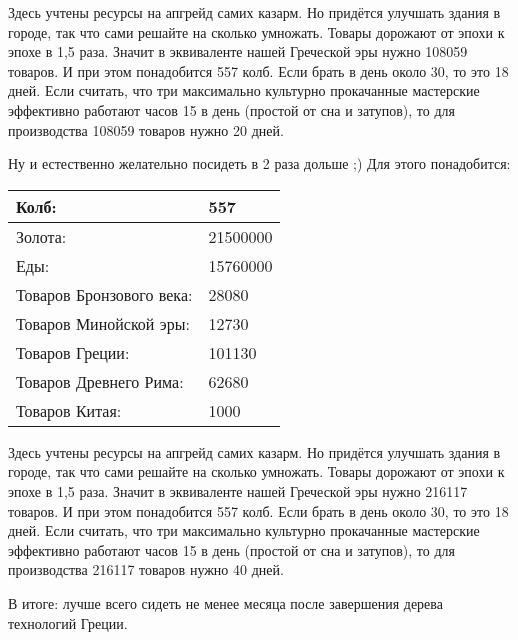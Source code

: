 Здесь учтены ресурсы на апгрейд самих казарм.
Но придётся улучшать здания в городе, так что сами решайте на сколько умножать.
Товары дорожают от эпохи к эпохе в 1,5 раза.
Значит в эквиваленте нашей Греческой эры нужно 108059 товаров.
И при этом понадобится 557 колб. Если брать в день около 30, то это 18 дней.
Если считать, что три максимально культурно прокачанные мастерские эффективно работают часов 15 в день (простой от сна и затупов),
то для производства 108059 товаров нужно 20 дней.



Ну и естественно желательно посидеть в 2 раза дольше ;)
Для этого понадобится:

\begin{center}
    \begin{tabular}[h!]{|l|l|}
        \hline
        Колб:                    & 557\\\hline
        Золота:                  & 21500000\\\hline
        Еды:                     & 15760000\\\hline
        Товаров Бронзового века: & 28080\\\hline
        Товаров Минойской эры:   & 12730\\\hline
        Товаров Греции:          & 101130\\\hline
        Товаров Древнего Рима:   & 62680\\\hline
        Товаров Китая:           & 1000\\\hline
    \end{tabular}
\end{center}

Здесь учтены ресурсы на апгрейд самих казарм.
Но придётся улучшать здания в городе, так что сами решайте на сколько умножать.
Товары дорожают от эпохи к эпохе в 1,5 раза.
Значит в эквиваленте нашей Греческой эры нужно 216117 товаров.
И при этом понадобится 557 колб. Если брать в день около 30, то это 18 дней.
Если считать, что три максимально культурно прокачанные мастерские эффективно работают часов 15 в день (простой от сна и затупов),
то для производства 216117 товаров нужно 40 дней.

В итоге: лучше всего сидеть не менее месяца после завершения дерева технологий Греции.
